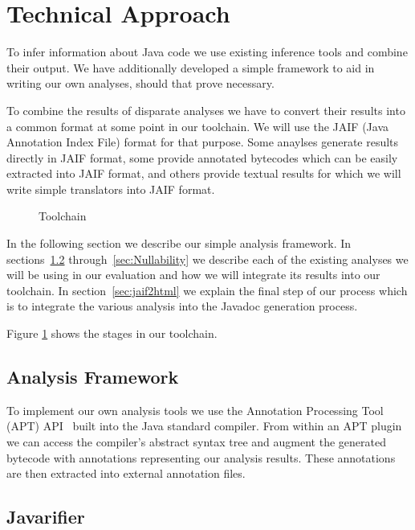 \section{Technical Approach}
To infer information about Java code we use existing inference tools and
combine their output. We have additionally developed a simple framework to aid
in writing our own analyses, should that prove necessary.

To combine the results of disparate analyses we have to convert their results
into a common format at some point in our toolchain.  We will use the JAIF
(Java Annotation Index File) format for that purpose.  Some anaylses generate
results directly in JAIF format, some provide annotated bytecodes which can be
easily extracted into JAIF format, and others provide textual results for which
we will write simple translators into JAIF format.

\begin{figure}
\centering
{}
\caption{Toolchain}
\label{fig:toolchain}
\end{figure}

In the following section we describe our simple analysis framework.  In
sections~\ref{sec:Javarifier} through~\ref{sec:Nullability} we describe each of
the existing analyses we will be using in our evaluation and how we will
integrate its results into our toolchain. In section~\ref{sec:jaif2html} we
explain the final step of our process which is to integrate the various
analysis into the Javadoc generation process.

Figure \ref{fig:toolchain} shows the stages in our toolchain.

\subsection{Analysis Framework}
\label{ss:analysisFramework}

To implement our own analysis tools we use the Annotation Processing Tool (APT)
API~\cite{apt} built into the Java standard compiler.  From within an APT plugin
we can access the compiler's abstract syntax tree and augment the generated
bytecode with annotations representing our analysis results. These annotations
are then extracted into external annotation files.

\subsection{Javarifier}
\label{sec:Javarifier}


